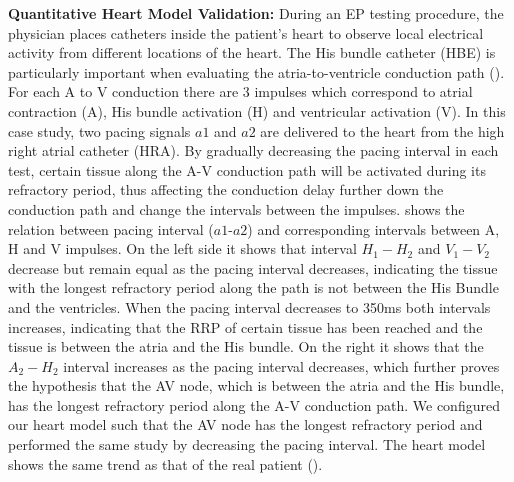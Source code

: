 \textbf{Quantitative Heart Model Validation:} During an EP testing procedure, the physician places catheters inside the patient's heart to observe local electrical activity from different locations of the heart. The His bundle catheter (HBE) is particularly important when evaluating the atria-to-ventricle conduction path (). For each A to V conduction there are 3 impulses which correspond to atrial contraction (A), His bundle activation (H) and ventricular activation (V).  In this case study, two pacing signals $a1$ and $a2$ are delivered to the heart from the high right atrial catheter (HRA). By gradually decreasing the pacing interval in each test, certain tissue along the A-V conduction path will be activated during its refractory period, thus affecting the conduction delay further down the conduction path and change the intervals between the impulses.  shows the relation between pacing interval ($a1$-$a2$) and corresponding intervals between A, H and V impulses. On the left side it shows that interval $H_1-H_2$ and $V_1-V_2$ decrease but remain equal as the pacing interval decreases, indicating the tissue with the longest refractory period along the path is not between the His Bundle and the ventricles. When the pacing interval decreases to 350ms both intervals increases, indicating that the RRP of certain tissue has been reached and the tissue is between the atria and the His bundle. On the right it shows that the $A_2-H_2$ interval increases as the pacing interval decreases, which further proves the hypothesis that the AV node, which is between the atria and the His bundle, has the longest refractory period along the A-V conduction path. We configured our heart model such that the AV node has the longest refractory period and performed the same study by decreasing the pacing interval. The heart model shows the same trend as that of the real patient ().
